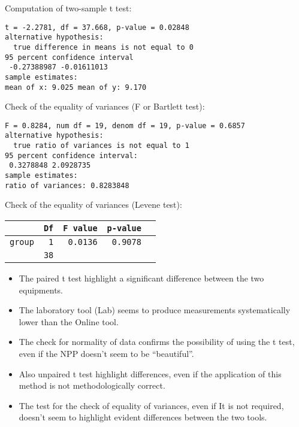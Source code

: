 \begin{frame}[fragile]
  Computation of two-sample t test:\\
  \begin{verbatim}
t = -2.2781, df = 37.668, p-value = 0.02848
alternative hypothesis: 
  true difference in means is not equal to 0
95 percent confidence interval
 -0.27388987 -0.01611013
sample estimates:
mean of x: 9.025 mean of y: 9.170 
  \end{verbatim}
\end{frame}

\begin{frame}[fragile]
  Check of the equality of variances (F or Bartlett test):
  \begin{verbatim}
F = 0.8284, num df = 19, denom df = 19, p-value = 0.6857
alternative hypothesis:
  true ratio of variances is not equal to 1
95 percent confidence interval:
 0.3278848 2.0928735
sample estimates:
ratio of variances: 0.8283848
  \end{verbatim}
   Check of the equality of variances (Levene test):\\
  \begin{tabular}{l|rrrr}
    \hline
    & \texttt{Df} & \texttt{F value} & \texttt{p-value} \\
    \hline
     \texttt{group} & \texttt{1} & \texttt{0.0136} & \texttt{0.9078} \\
     & \texttt{38} & & & \\
    \hline
  \end{tabular} 
\end{frame}

\begin{frame}
  \begin{itemize}
    \item The paired t test highlight a significant difference between the two equipments.
    \item The laboratory tool (Lab) seems to produce measurements systematically lower than the Online tool.
    \item The check for normality of data confirms the possibility of using the t test, even if the NPP doesn't seem to be ``beautiful''.
    \item Also unpaired t test highlight differences, even if the application of this method is not methodologically correct.
    \item The test for the check of equality of variances, even if It is not required, doesn't seem to highlight evident differences between the two tools.
  \end{itemize}
\end{frame}

